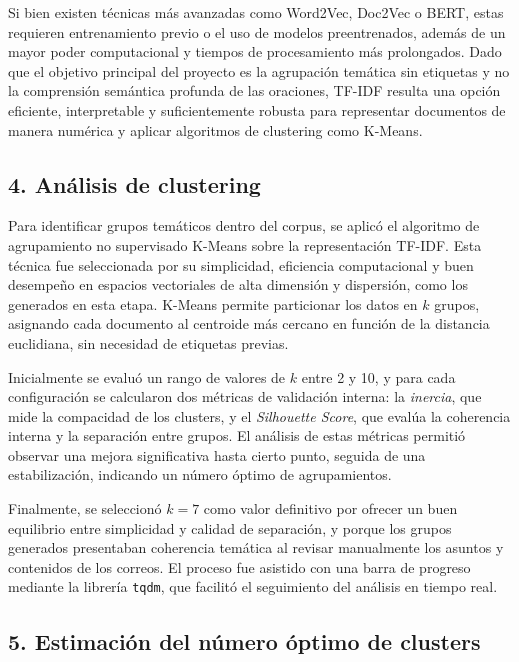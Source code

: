 \documentclass[journal]{IEEEtran}
\begin{document}
\vspace{12pt}
Si bien existen técnicas más avanzadas como Word2Vec, Doc2Vec o BERT, estas requieren entrenamiento previo o el uso de modelos preentrenados, además de un mayor poder computacional y tiempos de procesamiento más prolongados. Dado que el objetivo principal del proyecto es la agrupación temática sin etiquetas y no la comprensión semántica profunda de las oraciones, TF-IDF resulta una opción eficiente, interpretable y suficientemente robusta para representar documentos de manera numérica y aplicar algoritmos de clustering como K-Means.

\subsection*{4. Análisis de clustering}
Para identificar grupos temáticos dentro del corpus, se aplicó el algoritmo de agrupamiento no supervisado K-Means sobre la representación TF-IDF. Esta técnica fue seleccionada por su simplicidad, eficiencia computacional y buen desempeño en espacios vectoriales de alta dimensión y dispersión, como los generados en esta etapa. K-Means permite particionar los datos en $k$ grupos, asignando cada documento al centroide más cercano en función de la distancia euclidiana, sin necesidad de etiquetas previas.

\vspace{12pt}
Inicialmente se evaluó un rango de valores de $k$ entre 2 y 10, y para cada configuración se calcularon dos métricas de validación interna: la \textit{inercia}, que mide la compacidad de los clusters, y el \textit{Silhouette Score}, que evalúa la coherencia interna y la separación entre grupos. El análisis de estas métricas permitió observar una mejora significativa hasta cierto punto, seguida de una estabilización, indicando un número óptimo de agrupamientos.

\vspace{12pt}
Finalmente, se seleccionó $k=7$ como valor definitivo por ofrecer un buen equilibrio entre simplicidad y calidad de separación, y porque los grupos generados presentaban coherencia temática al revisar manualmente los asuntos y contenidos de los correos. El proceso fue asistido con una barra de progreso mediante la librería \texttt{tqdm}, que facilitó el seguimiento del análisis en tiempo real.

\subsection*{5. Estimación del número óptimo de clusters}
\end{document}
